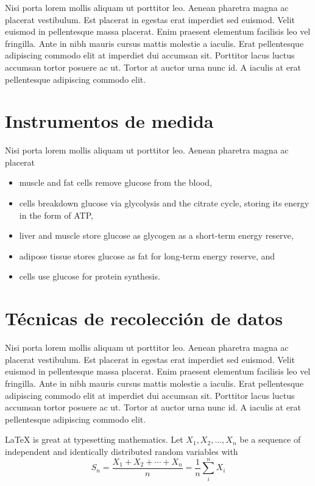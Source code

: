 Nisi porta lorem mollis aliquam ut porttitor leo. Aenean pharetra magna ac placerat vestibulum. Est placerat in egestas erat imperdiet sed euismod. Velit euismod in pellentesque massa placerat. Enim praesent elementum facilisis leo vel fringilla. Ante in nibh mauris cursus mattis molestie a iaculis. Erat pellentesque adipiscing commodo elit at imperdiet dui accumsan sit. Porttitor lacus luctus accumsan tortor posuere ac ut. Tortor at auctor urna nunc id. A iaculis at erat pellentesque adipiscing commodo elit.
\section{Instrumentos de medida}
Nisi porta lorem mollis aliquam ut porttitor leo. Aenean pharetra magna ac placerat \begin{itemize}
	\item muscle and fat cells remove glucose from the blood,
	\item cells breakdown glucose via glycolysis and the citrate cycle, storing its energy in the form of ATP,
	\item liver and muscle store glucose as glycogen as a short-term energy reserve,
	\item adipose tissue stores glucose as fat for long-term energy reserve, and
	\item cells use glucose for protein synthesis.
\end{itemize}

\section{Técnicas de recolección de datos}
Nisi porta lorem mollis aliquam ut porttitor leo. Aenean pharetra magna ac placerat vestibulum. Est placerat in egestas erat imperdiet sed euismod. Velit euismod in pellentesque massa placerat. Enim praesent elementum facilisis leo vel fringilla. Ante in nibh mauris cursus mattis molestie a iaculis. Erat pellentesque adipiscing commodo elit at imperdiet dui accumsan sit. Porttitor lacus luctus accumsan tortor posuere ac ut. Tortor at auctor urna nunc id. A iaculis at erat pellentesque adipiscing commodo elit.

\LaTeX{} is great at typesetting mathematics. Let $X_1, X_2, \ldots, X_n$ be a sequence of independent and identically distributed random variables with
\begin{equation}
	S_n = \frac{X_1 + X_2 + \cdots + X_n}{n}
	= \frac{1}{n}\sum_{i}^{n} X_i
	\label{eq1}
\end{equation}

